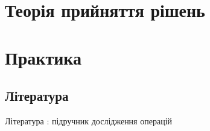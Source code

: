 \documentclass[a4paper,12pt,oneside,ukrainian]{book}
\begin{document}
\tableofcontents
\chapter{Теорія прийняття рішень}









\chapter{Практика}




\section{Література}
Література : підручник дослідження операцій \\
\end{document}
